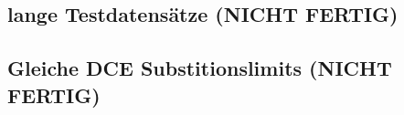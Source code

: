 {\begin{table}[ht]
\begin{tabular}{l|l|l|l}
					   \end{tabular}
					\end{table}
		
	}
	 \clearpage
\subsection{lange Testdatensätze (NICHT FERTIG)}{
	
}
\subsection{Gleiche DCE Substitionslimits (NICHT FERTIG)}{
	}
{
	

}
	

	





